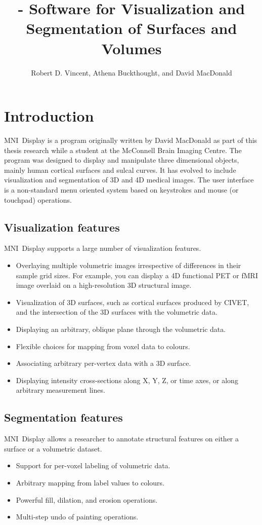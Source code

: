 \documentclass[11pt,letterpaper]{article}
\title{{\bf \display} - Software for Visualization and Segmentation of Surfaces and Volumes}
\author{Robert D. Vincent, Athena Buckthought, and David MacDonald}
\newcommand{\display}{\mbox{MNI Display}}
\begin{document}
\maketitle

\setcounter{tocdepth}{2}
\tableofcontents

\newpage

\section{Introduction}

\display{} is a program originally written by David MacDonald as part of
this thesis research while a student at the McConnell Brain Imaging
Centre. The program was designed to display and manipulate three
dimensional objects, mainly human cortical surfaces and sulcal
curves. It has evolved to include visualization and segmentation of 3D
and 4D medical images. The user interface is a non-standard menu
oriented system based on keystrokes and mouse (or touchpad) operations.

\subsection{Visualization features}
\display{} supports a large number of visualization features.
\begin{itemize}
\item Overlaying multiple volumetric images irrespective of differences
 in their sample grid sizes. For example, you can display a 4D functional
 PET or fMRI image overlaid on a high-resolution 3D structural image.
\item Visualization of 3D surfaces, such as cortical surfaces produced
  by CIVET, and the intersection of the 3D surfaces with the volumetric data.
\item Displaying an arbitrary, oblique plane through the volumetric data.
\item Flexible choices for mapping from voxel data to colours.
\item Associating arbitrary per-vertex data with a 3D surface.
\item Displaying intensity cross-sections along X, Y, Z, or time axes,
  or along arbitrary measurement lines.
\end{itemize}

\subsection{Segmentation features}
\display{} allows a researcher to annotate structural features on either a surface or a volumetric dataset.
\begin{itemize}
\item Support for per-voxel labeling of volumetric data.
\item Arbitrary mapping from label values to colours.
\item Powerful fill, dilation, and erosion operations.
\item Multi-step undo of painting operations.
\end{itemize}
\end{document}
